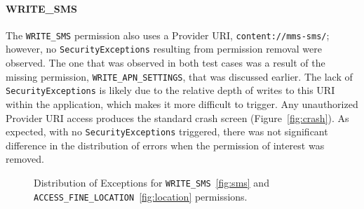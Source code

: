 \paragraph{\bfseries \ttfamily WRITE\_SMS}
The \texttt{WRITE\_SMS} permission also uses a Provider URI, \texttt{content://mms-sms/}; however, no \texttt{SecurityExceptions} resulting from permission removal were observed.  The one that was observed in both test cases was a result of the missing permission, \texttt{WRITE\_APN\_SETTINGS}, that was discussed earlier.  The lack of \texttt{SecurityExceptions} is likely due to the relative depth of writes to this URI within the application, which makes it more difficult to trigger.  Any unauthorized Provider URI access produces the standard crash screen (Figure~\ref{fig:crash}).  As expected, with no \texttt{SecurityExceptions} triggered, there was not significant difference in the distribution of errors when the permission of interest was removed. 

\begin{figure}[h!]
\hfill
\hfill
\hfill
\caption{Distribution of Exceptions for \texttt{WRITE\_SMS}~\ref{fig:sms} and \texttt{ACCESS\_FINE\_LOCATION}~\ref{fig:location} permissions.}
\end{figure}

